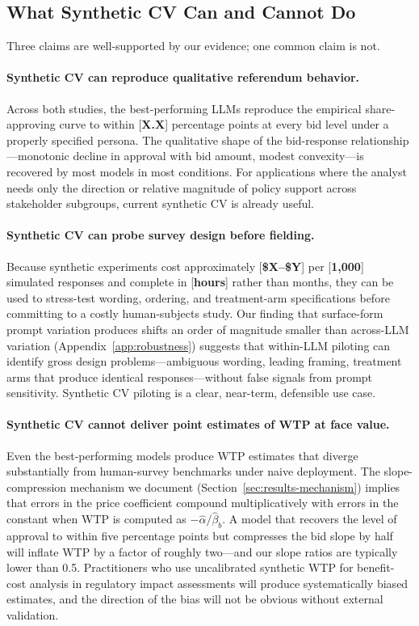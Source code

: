 \documentclass[12pt]{article}
\begin{document}
\subsection{What Synthetic CV Can and Cannot Do}\label{sec:disc-can-cant}

Three claims are well-supported by our evidence; one common claim is not.

\paragraph{Synthetic CV can reproduce qualitative referendum behavior.} Across both studies, the best-performing LLMs reproduce the empirical share-approving curve to within [\textbf{X.X}] percentage points at every bid level under a properly specified persona. The qualitative shape of the bid-response relationship---monotonic decline in approval with bid amount, modest convexity---is recovered by most models in most conditions. For applications where the analyst needs only the direction or relative magnitude of policy support across stakeholder subgroups, current synthetic CV is already useful.

\paragraph{Synthetic CV can probe survey design before fielding.} Because synthetic experiments cost approximately [\textbf{\$X--\$Y}] per [\textbf{1{,}000}] simulated responses and complete in [\textbf{hours}] rather than months, they can be used to stress-test wording, ordering, and treatment-arm specifications before committing to a costly human-subjects study. Our finding that surface-form prompt variation produces shifts an order of magnitude smaller than across-LLM variation (Appendix~\ref{app:robustness}) suggests that within-LLM piloting can identify gross design problems---ambiguous wording, leading framing, treatment arms that produce identical responses---without false signals from prompt sensitivity. Synthetic CV piloting is a clear, near-term, defensible use case.

\paragraph{Synthetic CV cannot deliver point estimates of WTP at face value.} Even the best-performing models produce WTP estimates that diverge substantially from human-survey benchmarks under naive deployment. The slope-compression mechanism we document (Section~\ref{sec:results-mechanism}) implies that errors in the price coefficient compound multiplicatively with errors in the constant when WTP is computed as $-\hat{\alpha}/\hat{\beta}_b$. A model that recovers the level of approval to within five percentage points but compresses the bid slope by half will inflate WTP by a factor of roughly two---and our slope ratios are typically lower than 0.5. Practitioners who use uncalibrated synthetic WTP for benefit-cost analysis in regulatory impact assessments will produce systematically biased estimates, and the direction of the bias will not be obvious without external validation.
\end{document}
